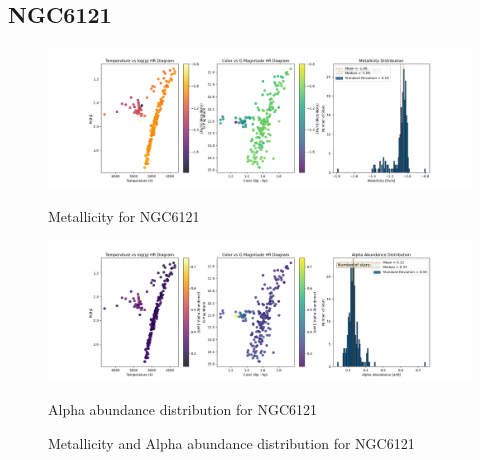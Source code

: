 \documentclass[a4paper,12pt]{article}
\begin{document}
\subsection{NGC6121}
\begin{figure}[H]
    \centering
    \begin{minipage}[b]{0.8\textwidth}
        \centering
        \includegraphics[width=\textwidth]{NGC6121_metalicity.png}
        \caption{Metallicity for NGC6121}
        \label{fig:NGC6121_metalicity}
    \end{minipage}
    \hfill
    \begin{minipage}[b]{0.8\textwidth}
        \centering
        \includegraphics[width=\textwidth]{NGC6121_alpha.png}
        \caption{Alpha abundance distribution for NGC6121}
        \label{fig:NGC6121_alpha}
    \end{minipage}
    \caption{Metallicity and Alpha abundance distribution for NGC6121}
    \label{fig:NGC6121_combined}
\end{figure}
\clearpage
\end{document}
